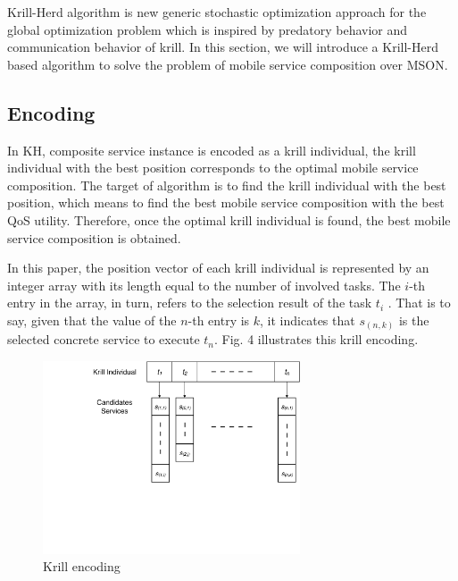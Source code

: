 \documentclass[10pt,journal,compsoc]{IEEEtran}
\begin{document}
Krill-Herd algorithm \cite{gandomi2012krill} is new generic stochastic optimization approach for the global optimization problem which is inspired by predatory behavior and communication behavior of krill. 
In this section, we will introduce a Krill-Herd based algorithm to solve the problem of mobile service composition over MSON.


\subsection{Encoding}
In KH, composite service instance is encoded as a krill individual, the krill individual with the best position corresponds to the optimal mobile service composition. The target of algorithm is to find the krill individual with the best position, which means to find the best mobile service composition with the best QoS utility. Therefore, once the optimal krill individual is found, the best mobile service composition is obtained.

In this paper, the position vector of each krill individual is represented by an integer array with its length equal to the number of involved tasks. The $i$-th entry in the array, in turn, refers to the selection result of the task $t_i$ . That is to say, given that the value of the $n$-th entry is $k$, it indicates that $s_{(n,k)}$ is the selected concrete service to execute $t_n$. Fig. 4 illustrates this krill encoding.

\begin{figure}[!t]
\centering
\includegraphics[width=3in]{./img/pic4.pdf}
\caption{Krill encoding}
\label{Krill encoding}
\end{figure}
\end{document}
